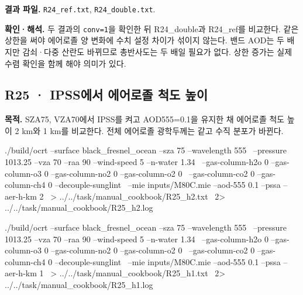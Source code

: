 \textbf{결과 파일. }\texttt{R24\_\allowbreak{}ref.txt}, \texttt{R24\_\allowbreak{}double.txt}.

\textbf{확인·해석. }두 결과의 \texttt{conv=\allowbreak{}1}을 확인한 뒤 R24\_double과 R24\_ref를 비교한다. 같은 상한을 써야 에어로졸 양 변화에 수치 설정 차이가 섞이지 않는다. 밴드 AOD는 두 배지만 감쇠·다중 산란도 바뀌므로 총반사도는 두 배일 필요가 없다. 상한 증가는 실제 수렴 확인을 함께 해야 의미가 있다.


\subsection{R25 · IPSS에서 에어로졸 척도 높이}
\label{sec:auto:09_cookbook:5.5}

\label{recipe:R25}

\textbf{목적. }SZA75\textdegree{}, VZA70\textdegree{}에서 IPSS를 켜고 AOD555=0.1을 유지한 채 에어로졸 척도 높이 2 km와 1 km를 비교한다. 전체 에어로졸 광학두께는 같고 수직 분포가 바뀐다.

\noindent\begin{minipage}{\linewidth}
\begin{ManualCode}

./build/ocrt --surface black_fresnel_ocean --sza 75 --wavelength 555 \
  --pressure 1013.25 --vza 70 --raa 90 --wind-speed 5 --n-water 1.34 \
  --gas-column-h2o 0 --gas-column-o3 0 --gas-column-no2 0 --gas-column-o2 0 \
  --gas-column-co2 0 --gas-column-ch4 0 --decouple-sunglint \
  --mie inputs/M80C.mie --aod-555 0.1 --pssa --aer-h-km 2 \
  > ../../task/manual_cookbook/R25_h2.txt \
  2> ../../task/manual_cookbook/R25_h2.log

\end{ManualCode}
\end{minipage}\par

\noindent\begin{minipage}{\linewidth}
\begin{ManualCode}

./build/ocrt --surface black_fresnel_ocean --sza 75 --wavelength 555 \
  --pressure 1013.25 --vza 70 --raa 90 --wind-speed 5 --n-water 1.34 \
  --gas-column-h2o 0 --gas-column-o3 0 --gas-column-no2 0 --gas-column-o2 0 \
  --gas-column-co2 0 --gas-column-ch4 0 --decouple-sunglint \
  --mie inputs/M80C.mie --aod-555 0.1 --pssa --aer-h-km 1 \
  > ../../task/manual_cookbook/R25_h1.txt \
  2> ../../task/manual_cookbook/R25_h1.log

\end{ManualCode}
\end{minipage}\par

